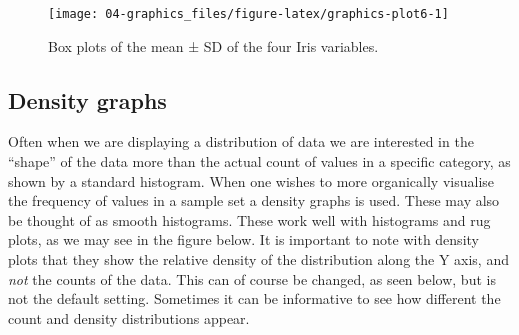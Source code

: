 \documentclass[english,10pt,a4paper,oneside]{book}
\theoremstyle{definition}
\theoremstyle{definition}
\theoremstyle{definition}
\theoremstyle{remark}
\begin{document}
\begin{figure}
\texttt{[image: 04-graphics\_files/figure-latex/graphics-plot6-1]} \caption{Box plots of the mean ± SD of the four Iris variables.}\label{fig:graphics-plot6}
\end{figure}

\hypertarget{density-graphs}{%
\subsection{Density graphs}\label{density-graphs}}

Often when we are displaying a distribution of data we are interested in
the \enquote{shape} of the data more than the actual count of values in
a specific category, as shown by a standard histogram. When one wishes
to more organically visualise the frequency of values in a sample set a
density graphs is used. These may also be thought of as smooth
histograms. These work well with histograms and rug plots, as we may see
in the figure below. It is important to note with density plots that
they show the relative density of the distribution along the Y axis, and
\emph{not} the counts of the data. This can of course be changed, as
seen below, but is not the default setting. Sometimes it can be
informative to see how different the count and density distributions
appear.
\end{document}
